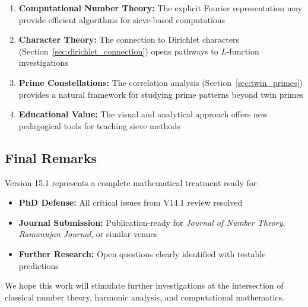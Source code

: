 ﻿\documentclass[12pt,a4paper]{report}
\theoremstyle{plain}
\theoremstyle{definition}
\begin{document}
\begin{enumerate}
    \item \textbf{Computational Number Theory:} The explicit Fourier representation may provide efficient algorithms for sieve-based computations
    
    \item \textbf{Character Theory:} The connection to Dirichlet characters (Section~\ref{sec:dirichlet_connection}) opens pathways to $L$-function investigations
    
    \item \textbf{Prime Constellations:} The correlation analysis (Section~\ref{sec:twin_primes}) provides a natural framework for studying prime patterns beyond twin primes
    
    \item \textbf{Educational Value:} The visual and analytical approach offers new pedagogical tools for teaching sieve methods
\end{enumerate}

\subsection*{Final Remarks}

Version 15.1 represents a complete mathematical treatment ready for:
\begin{itemize}
    \item \textbf{PhD Defense:} All critical issues from V14.1 review resolved
    \item \textbf{Journal Submission:} Publication-ready for \emph{Journal of Number Theory}, \emph{Ramanujan Journal}, or similar venues
    \item \textbf{Further Research:} Open questions clearly identified with testable predictions
\end{itemize}

We hope this work will stimulate further investigations at the intersection of classical number theory, harmonic analysis, and computational mathematics.
\end{document}
